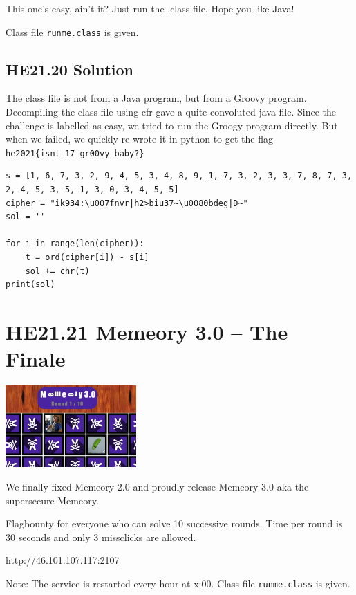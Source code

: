 \documentclass[english,a4paper,nols,noindent]{tufte-handout}
\begin{document}
\noindent This one's easy, ain't it? Just run the .class file. Hope you like Java!

Class file \verb+runme.class+ is given.

\hypertarget{he21.20-solution}{%
\subsection{HE21.20 Solution}\label{he21.20-solution}}

\noindent The class file is not from a Java program, but from a Groovy
program.  Decompiling the class file using cfr gave a quite convoluted
java file.  Since the challenge is labelled as easy, we tried to run
the Groogy program directly.  But when we failed, we quickly re-wrote
it in python to get the flag \verb+he2021{isnt_17_gr00vy_baby?}+

\begin{verbatim}
s = [1, 6, 7, 3, 2, 9, 4, 5, 3, 4, 8, 9, 1, 7, 3, 2, 3, 3, 7, 8, 7, 3, 2, 4, 5, 3, 5, 1, 3, 0, 3, 4, 5, 5]
cipher = "ik934:\u007fnvr|h2>biu37~\u0080bdeg|D~"
sol = ''

for i in range(len(cipher)):
    t = ord(cipher[i]) - s[i]
    sol += chr(t)
print(sol)
\end{verbatim}

\hypertarget{he21.21}{%
  \section{HE21.21 Memeory 3.0 -- The Finale}
  \label{he21.21}}
\begin{marginfigure}
    \includegraphics[width=50mm]{images/challenge21.jpg}
\end{marginfigure}

\noindent We finally fixed Memeory 2.0 and proudly release Memeory 3.0 aka the supersecure-Memeory.

Flagbounty for everyone who can solve 10 successive rounds. Time per round is 30 seconds and only 3 missclicks are allowed.

\url{http://46.101.107.117:2107}

Note: The service is restarted every hour at x:00.
Class file \verb+runme.class+ is given.
\end{document}
